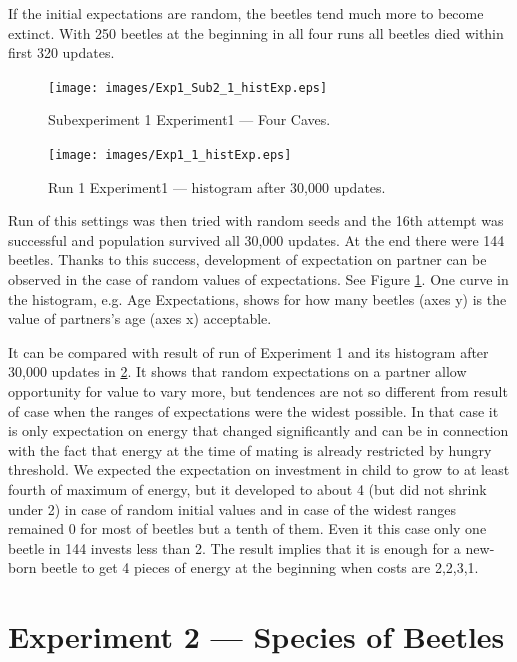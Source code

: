 \documentclass[a4paper,12pt]{report}
\begin{document}
If the initial expectations are random, the beetles tend much more to become extinct. With 250 beetles at the beginning in all four runs all beetles died within first 320 updates.

\begin{figure}
\begin{center}
  \texttt{[image: images/Exp1\_Sub2\_1\_histExp.eps]}
  \caption{Subexperiment 1 Experiment1 --- Four Caves.}
  \label{img.Exp1_Sub2_1_histExp}
\end{center}
\end{figure}

\begin{figure}
\begin{center}
  \texttt{[image: images/Exp1\_1\_histExp.eps]}
  \caption{Run 1 Experiment1 --- histogram after 30,000 updates.}
  \label{img.Exp1_1_histExp}
\end{center}
\end{figure}

Run of this settings was then tried with random seeds and the 16th attempt was successful and population survived all 30,000 updates. At the end there were 144 beetles. Thanks to this success, development of expectation on partner can be observed in the case of random values of expectations. See Figure \ref{img.Exp1_Sub2_1_histExp}. One curve in the histogram, e.g. Age Expectations, shows for how many beetles (axes y) is the value of partners's age (axes x) acceptable.

It can be compared with result of run of Experiment 1 and its histogram after 30,000 updates in \ref{img.Exp1_1_histExp}. It shows that random expectations on a partner allow opportunity for value to vary more, but tendences are not so different from result of case when the ranges of expectations were the widest possible. In that case it is only expectation on energy that changed significantly and can be in connection with the fact that energy at the time of mating is already restricted by hungry threshold. We expected the expectation on investment in child to grow to at least fourth of maximum of energy, but it developed to about 4 (but did not shrink under 2) in case of random initial values and in case of the widest ranges remained 0 for most of beetles but a tenth of them. Even it this case only one beetle in 144 invests less than 2. The result implies that it is enough for a new-born beetle to get 4 pieces of energy at the beginning when costs are 2,2,3,1.

\section{Experiment 2 --- Species of Beetles}
\end{document}
